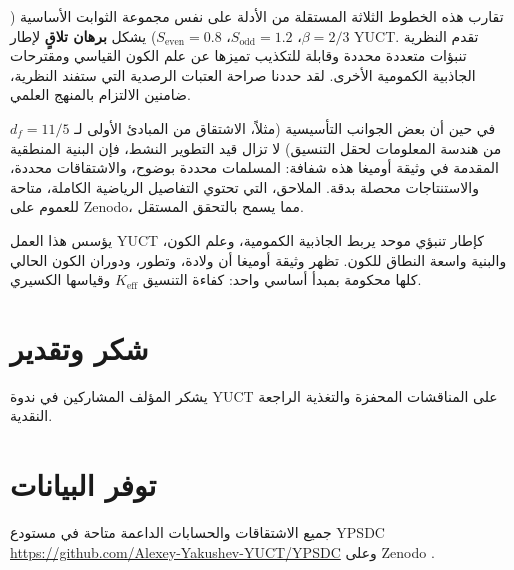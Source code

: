 \documentclass[12pt,a4paper]{article}
\begin{document}
	تقارب هذه الخطوط الثلاثة المستقلة من الأدلة على نفس مجموعة الثوابت الأساسية (\(\beta = 2/3\)، \(S_{\mathrm{odd}}=1.2\)، \(S_{\mathrm{even}}=0.8\)) يشكل \textbf{برهان تلاقٍ} لإطار YUCT. تقدم النظرية تنبؤات متعددة محددة وقابلة للتكذيب تميزها عن علم الكون القياسي ومقترحات الجاذبية الكمومية الأخرى. لقد حددنا صراحة العتبات الرصدية التي ستفند النظرية، ضامنين الالتزام بالمنهج العلمي.
	
	في حين أن بعض الجوانب التأسيسية (مثلاً، الاشتقاق من المبادئ الأولى لـ \(d_f = 11/5\) من هندسة المعلومات لحقل التنسيق) لا تزال قيد التطوير النشط، فإن البنية المنطقية المقدمة في وثيقة أوميغا هذه شفافة: المسلمات محددة بوضوح، والاشتقاقات محددة، والاستنتاجات محصلة بدقة. الملاحق، التي تحتوي التفاصيل الرياضية الكاملة، متاحة للعموم على Zenodo، مما يسمح بالتحقق المستقل.
	
	يؤسس هذا العمل YUCT كإطار تنبؤي موحد يربط الجاذبية الكمومية، وعلم الكون، والبنية واسعة النطاق للكون. تظهر وثيقة أوميغا أن ولادة، وتطور، ودوران الكون الحالي كلها محكومة بمبدأ أساسي واحد: كفاءة التنسيق \(K_{\mathrm{eff}}\) وقياسها الكسيري.
	
	\section*{شكر وتقدير}
	
	يشكر المؤلف المشاركين في ندوة YUCT على المناقشات المحفزة والتغذية الراجعة النقدية.
	
	\section*{توفر البيانات}
	
	جميع الاشتقاقات والحسابات الداعمة متاحة في مستودع YPSDC \url{https://github.com/Alexey-Yakushev-YUCT/YPSDC} وعلى Zenodo \cite{AppendixL,AppendixY,AppendixP,AppendixM,AppendixΩ,AppendixB}.
	
\end{document}
